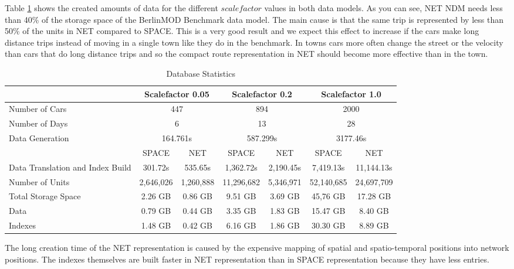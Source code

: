 \documentclass[a4paper]{article}
\newcommand{\bmodb} {BerlinMOD Benchmark}
\begin{document}
Table \ref{tab:dbstat} shows the created amounts of data for the different $scalefactor$
values in both data models. As you can see, NET NDM needs less
than 40\% of the storage space of the \bmodb{} data model. The main cause is that
the same trip is represented by less than 50\% of the units in NET
compared to SPACE. This is a very good result and we expect this effect to
increase if the cars make long distance
trips instead of moving in a single town like they do in the benchmark. In towns
cars more often change the street or the velocity than cars that do long distance
trips and so the compact route representation in NET should become
more effective than in the town.
\begin{table}[H]
\begin{center}
\begin{scriptsize}
\begin{tabularx}{1.0\textwidth}{|X|c|c|c|c|c|c|}
\hline
&\multicolumn{2}{c|}{\textbf{Scalefactor 0.05}}&\multicolumn{2}{c|}{\textbf{Scalefactor 0.2}}&\multicolumn{2}{c|}{\textbf{Scalefactor 1.0}}\\
\hline
Number of Cars&\multicolumn{2}{c|}{447}&\multicolumn{2}{c|}{894}&\multicolumn{2}{c|}{2000}\\
\hline
Number of Days&\multicolumn{2}{c|}{6}&\multicolumn{2}{c|}{13}&\multicolumn{2}{c|}{28}\\
\hline
Data Generation&\multicolumn{2}{c|}{164.761s}&\multicolumn{2}{c|}{587.299s}&\multicolumn{2}{c|}{3177.46s}\\
\hline
&SPACE&NET&SPACE&NET&SPACE&NET\\
\hline
Data Translation
and Index Build&301.72s&535.65s&1,362.72s&2,190.45s&7,419.13s&11,144.13s\\
\hline
Number of Units&2,646,026&1,260,888&11,296,682&5,346,971&52,140,685&24,697,709\\
\hline
Total Storage Space&2.26 GB&0.86 GB&9.51 GB&3.69 GB&45,76 GB&17.28 GB\\
Data&0.79 GB&0.44 GB&3.35 GB&1.83 GB&15.47 GB& 8.40 GB\\
Indexes&1.48 GB&0.42 GB&6.16 GB&1.86 GB&30.30 GB&8.89 GB\\
\hline
\end{tabularx}
\end{scriptsize}
\caption{Database Statistics}
\label{tab:dbstat}
\end{center}
\end{table}
The long creation time of the NET representation is
caused by the expensive mapping of spatial and spatio-temporal positions into
network positions. The indexes themselves are built faster in NET representation
than in SPACE representation because they have less entries.
\end{document}
